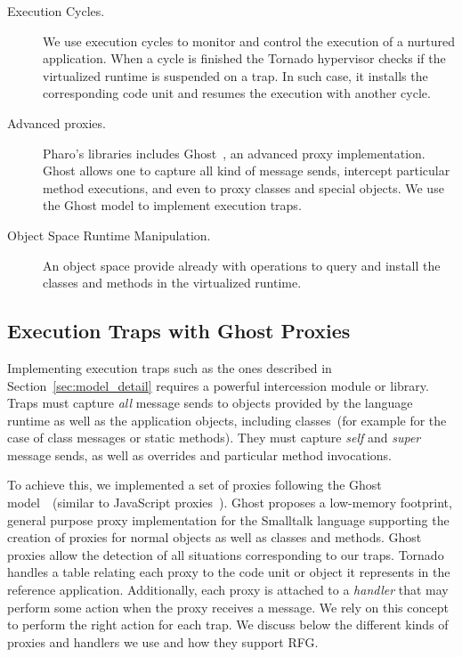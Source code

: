 \begin{description}
\item[Execution Cycles.] We use \Vtt execution cycles to monitor and control the execution of a nurtured application. When a cycle is finished the Tornado hypervisor checks if the virtualized runtime is suspended on a trap. In such case, it installs the corresponding code unit and resumes the execution with another cycle.

\item[Advanced proxies.] Pharo's libraries includes Ghost~\cite{Mart11a}, an advanced proxy implementation. Ghost allows one to capture all kind of message sends, intercept particular method executions, and even to proxy classes and special objects. We use the Ghost model to implement execution traps.

\item[Object Space Runtime Manipulation.] An object space provide already with operations to query and install the classes and methods in the virtualized runtime.

\end{description}

\subsection{Execution Traps with Ghost Proxies} \label{sec:proxies}

Implementing execution traps such as the ones described in Section~\ref{sec:model_detail} requires a powerful intercession module or library. Traps must capture \emph{all} message sends to objects provided by the language runtime as well as the application objects, including classes~(for example for the case of class messages or static methods). They must capture \emph{self} and \emph{super} message sends, as well as overrides and particular method invocations.

To achieve this, we implemented a set of proxies following the Ghost model~\cite{Mart11a}~(similar to JavaScript proxies~\cite{Vanc10a}). Ghost proposes a low-memory footprint, general purpose proxy implementation for the Smalltalk language supporting the creation of proxies for normal objects as well as classes and methods. 
Ghost proxies allow the detection of all situations corresponding to our traps.
Tornado handles a table relating each proxy to the code unit or object it represents in the reference application.
Additionally, each proxy is attached to a \emph{handler} that may perform some action when the proxy receives a message.
We rely on this concept to perform the right action for each trap.
We discuss below the different kinds of proxies and handlers we use and how they support RFG.

